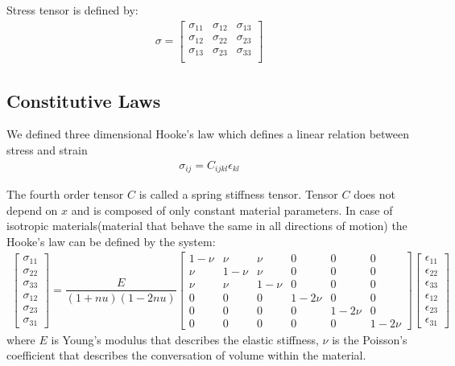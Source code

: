 \documentclass[en]{minipw} %
\begin{document}
Stress tensor is defined by:
\begin{equation}
\begin{aligned}
\sigma =
\begin{bmatrix}
\sigma_{11} & \sigma_{12} & \sigma_{13} \\
\sigma_{12} & \sigma_{22} & \sigma_{23} \\
\sigma_{13} & \sigma_{23} & \sigma_{33} \\
\end{bmatrix}
\end{aligned}
\end{equation}

\subsection{Constitutive Laws}
We defined three dimensional Hooke's law which defines a linear relation between stress and strain
\begin{equation}
\begin{aligned}
\sigma_{ij} = C_{ijkl}\epsilon_{kl}
\end{aligned}
\end{equation}

The fourth order tensor $C$ is called a spring stiffness tensor. Tensor $C$ does not depend on $x$ and is composed of only constant material parameters. In case of isotropic materials(material that behave the same in all directions of motion) the Hooke's law can be defined by the system:
\begin{equation}
\begin{aligned}
\begin{bmatrix}
\sigma_{11} \\
\sigma_{22} \\
\sigma_{33} \\
\sigma_{12} \\
\sigma_{23} \\
\sigma_{31}
\end{bmatrix}
=
\dfrac{E}{(1+ nu)(1 - 2 nu)}
\begin{bmatrix}
1 - \nu & \nu & \nu & 0 & 0 & 0 \\
\nu & 1 - \nu &  \nu & 0 & 0 & 0 \\
\nu & \nu & 1 - \nu & 0 & 0 & 0 \\
0 & 0 & 0 & 1 - 2 \nu & 0 & 0 \\
0 & 0 & 0 & 0 & 1 - 2 \nu & 0 \\
0 & 0 & 0 & 0 & 0 & 1 - 2 \nu
\end{bmatrix}
\begin{bmatrix}
\epsilon_{11} \\
\epsilon_{22} \\
\epsilon_{33} \\
\epsilon_{12} \\
\epsilon_{23} \\
\epsilon_{31}
\end{bmatrix}
\end{aligned}
\end{equation}
where $E$ is Young's modulus that describes the elastic stiffness, $\nu$ is the Poisson's coefficient that describes the conversation of volume within the material.
\end{document}
